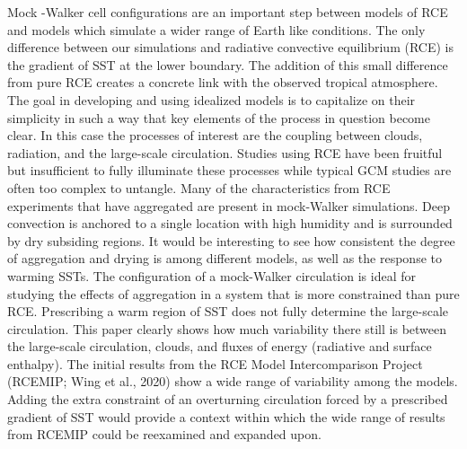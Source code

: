 \documentclass[draft]{agujournal2019}
\begin{document}
{%

Mock -Walker cell configurations are an important step between models of RCE and models which simulate a wider range of Earth like conditions.
The only difference between our simulations and radiative convective equilibrium (RCE) is the gradient of SST at the lower boundary.  
The addition of this small difference from pure RCE creates a concrete link with the observed tropical atmosphere.  
The goal in developing and using idealized models is to capitalize on their simplicity in such a way that key elements of the 
process in question become clear.  
In this case the processes of interest are the coupling between clouds, radiation, and the large-scale circulation.  
Studies using RCE have been fruitful but insufficient to fully illuminate these processes while typical GCM studies are often too complex to untangle.  
Many of the characteristics from RCE experiments that have aggregated are present in mock-Walker simulations.   
Deep convection is anchored to a single location with high humidity and is surrounded by dry subsiding regions.  
It would be interesting to see how consistent the degree of aggregation and drying is among 
different models, as well as the response to warming SSTs.  The configuration of a mock-Walker circulation 
is ideal for studying the effects of aggregation in a system that is more constrained than pure RCE.     
Prescribing a warm region of SST does not fully determine the large-scale circulation.  
This paper clearly shows how much variability there still is between the large-scale circulation, clouds, 
and fluxes of energy (radiative and surface enthalpy).
The initial results from the RCE Model Intercomparison Project (RCEMIP; Wing et al., 2020) show a wide range of variability among the models.
Adding the extra constraint of an overturning circulation forced by a prescribed gradient of SST would provide a context within which the 
wide range of results from RCEMIP could be reexamined and expanded upon.  

}
\end{document}
